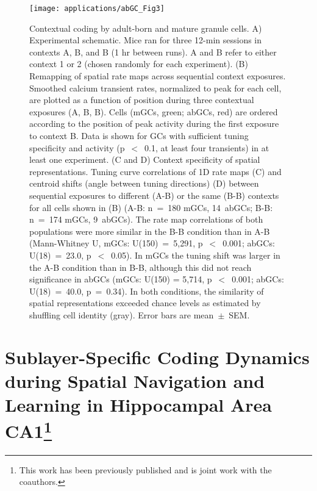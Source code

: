 \begin{figure}
	\centering
	\texttt{[image: applications/abGC\_Fig3]}
	\caption[Contextual coding by adult-born and mature granule cells]{Contextual coding by adult-born and mature granule cells.
	A) Experimental schematic. Mice ran for three 12-min sessions in contexts A, B, and B (1 hr between runs). A and B refer to either context 1 or 2 (chosen randomly for each experiment).
	(B) Remapping of spatial rate maps across sequential context exposures. Smoothed calcium transient rates, normalized to peak for each cell, are plotted as a function of position during three contextual exposures (A, B, B). Cells (mGCs, green; abGCs, red) are ordered according to the position of peak activity during the first exposure to context B. Data is shown for GCs with sufficient tuning specificity and activity (p~$<$~0.1, at least four transients) in at least one experiment.
	(C and D) Context specificity of spatial representations. Tuning curve correlations of 1D rate maps (C) and centroid shifts (angle between tuning directions) (D) between sequential exposures to different (A-B) or the same (B-B) contexts for all cells shown in (B) (A-B: n~=~180 mGCs, 14~abGCs; B-B: n~=~174 mGCs, 9~abGCs). The rate map correlations of both populations were more similar in the B-B condition than in A-B (Mann-Whitney U, mGCs: U(150)~=~5,291, p~$<$~0.001; abGCs: U(18)~=~23.0, p~$<$~0.05). In mGCs the tuning shift was larger in the A-B condition than in B-B, although this did not reach significance in abGCs (mGCs: U(150) = 5,714, p~$<$~0.001; abGCs: U(18)~=~40.0, p~=~0.34). In both conditions, the similarity of spatial representations exceeded chance levels as estimated by shuffling cell identity (gray).
	Error bars are mean~$\pm$~SEM.}
	\label{fig:applications:dg:context}
\end{figure}

\section[Sublayer-Specific Coding Dynamics during Spatial Navigation and Learning in Hippocampal Area CA1]{Sublayer-Specific Coding Dynamics during Spatial Navigation and Learning in Hippocampal Area CA1\footnote{This work has been previously published \citep{Danielson2016b} and is joint work with the coauthors.}}

